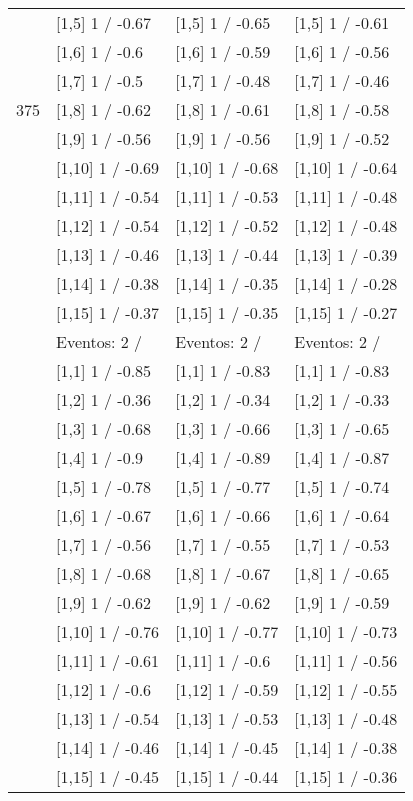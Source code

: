 \begin{table}
\begin{tabular}[t]{llll}
 & {}[1,5] 1  / -0.67 & {}[1,5] 1  / -0.65 & {}[1,5] 1  / -0.61\\
 & {}[1,6] 1  / -0.6 & {}[1,6] 1  / -0.59 & {}[1,6] 1  / -0.56\\
 & {}[1,7] 1  / -0.5 & {}[1,7] 1  / -0.48 & {}[1,7] 1  / -0.46\\
375 & {}[1,8] 1  / -0.62 & {}[1,8] 1  / -0.61 & {}[1,8] 1  / -0.58\\
\addlinespace
 & {}[1,9] 1  / -0.56 & {}[1,9] 1  / -0.56 & {}[1,9] 1  / -0.52\\
 & {}[1,10] 1  / -0.69 & {}[1,10] 1  / -0.68 & {}[1,10] 1  / -0.64\\
 & {}[1,11] 1  / -0.54 & {}[1,11] 1  / -0.53 & {}[1,11] 1  / -0.48\\
 & {}[1,12] 1  / -0.54 & {}[1,12] 1  / -0.52 & {}[1,12] 1  / -0.48\\
 & {}[1,13] 1  / -0.46 & {}[1,13] 1  / -0.44 & {}[1,13] 1  / -0.39\\
\addlinespace
 & {}[1,14] 1  / -0.38 & {}[1,14] 1  / -0.35 & {}[1,14] 1  / -0.28\\
 & {}[1,15] 1  / -0.37 & {}[1,15] 1  / -0.35 & {}[1,15] 1  / -0.27\\
 & Eventos:  2 / & Eventos:  2 / & Eventos:  2 /\\
 & {}[1,1] 1  / -0.85 & {}[1,1] 1  / -0.83 & {}[1,1] 1  / -0.83\\
 & {}[1,2] 1  / -0.36 & {}[1,2] 1  / -0.34 & {}[1,2] 1  / -0.33\\
\addlinespace
 & {}[1,3] 1  / -0.68 & {}[1,3] 1  / -0.66 & {}[1,3] 1  / -0.65\\
 & {}[1,4] 1  / -0.9 & {}[1,4] 1  / -0.89 & {}[1,4] 1  / -0.87\\
 & {}[1,5] 1  / -0.78 & {}[1,5] 1  / -0.77 & {}[1,5] 1  / -0.74\\
 & {}[1,6] 1  / -0.67 & {}[1,6] 1  / -0.66 & {}[1,6] 1  / -0.64\\
 & {}[1,7] 1  / -0.56 & {}[1,7] 1  / -0.55 & {}[1,7] 1  / -0.53\\
\addlinespace
500 & {}[1,8] 1  / -0.68 & {}[1,8] 1  / -0.67 & {}[1,8] 1  / -0.65\\
 & {}[1,9] 1  / -0.62 & {}[1,9] 1  / -0.62 & {}[1,9] 1  / -0.59\\
 & {}[1,10] 1  / -0.76 & {}[1,10] 1  / -0.77 & {}[1,10] 1  / -0.73\\
 & {}[1,11] 1  / -0.61 & {}[1,11] 1  / -0.6 & {}[1,11] 1  / -0.56\\
 & {}[1,12] 1  / -0.6 & {}[1,12] 1  / -0.59 & {}[1,12] 1  / -0.55\\
\addlinespace
 & {}[1,13] 1  / -0.54 & {}[1,13] 1  / -0.53 & {}[1,13] 1  / -0.48\\
 & {}[1,14] 1  / -0.46 & {}[1,14] 1  / -0.45 & {}[1,14] 1  / -0.38\\
 & {}[1,15] 1  / -0.45 & {}[1,15] 1  / -0.44 & {}[1,15] 1  / -0.36\\
\bottomrule
\end{tabular}
\end{table}
